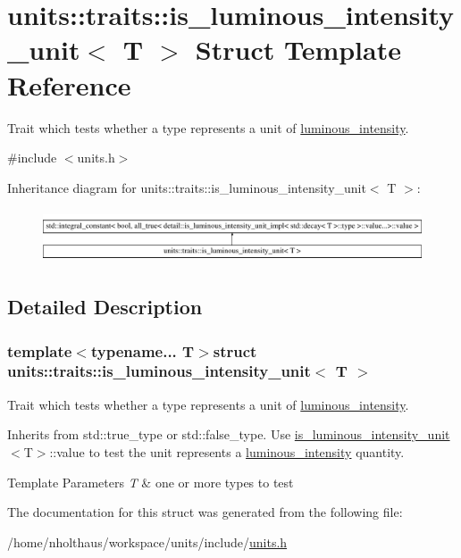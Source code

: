 \hypertarget{structunits_1_1traits_1_1is__luminous__intensity__unit}{}\section{units\+:\+:traits\+:\+:is\+\_\+luminous\+\_\+intensity\+\_\+unit$<$ T $>$ Struct Template Reference}
\label{structunits_1_1traits_1_1is__luminous__intensity__unit}


Trait which tests whether a type represents a unit of \hyperlink{namespaceunits_1_1luminous__intensity}{luminous\+\_\+intensity}.  




{\ttfamily \#include $<$units.\+h$>$}

Inheritance diagram for units\+:\+:traits\+:\+:is\+\_\+luminous\+\_\+intensity\+\_\+unit$<$ T $>$\+:\begin{figure}[H]
\begin{center}
\leavevmode
\includegraphics[height=1.613833cm]{structunits_1_1traits_1_1is__luminous__intensity__unit}
\end{center}
\end{figure}


\subsection{Detailed Description}
\subsubsection*{template$<$typename... T$>$struct units\+::traits\+::is\+\_\+luminous\+\_\+intensity\+\_\+unit$<$ T $>$}

Trait which tests whether a type represents a unit of \hyperlink{namespaceunits_1_1luminous__intensity}{luminous\+\_\+intensity}. 

Inherits from {\ttfamily std\+::true\+\_\+type} or {\ttfamily std\+::false\+\_\+type}. Use {\ttfamily \hyperlink{structunits_1_1traits_1_1is__luminous__intensity__unit}{is\+\_\+luminous\+\_\+intensity\+\_\+unit}$<$T$>$\+::value} to test the unit represents a \hyperlink{namespaceunits_1_1luminous__intensity}{luminous\+\_\+intensity} quantity. 
\begin{DoxyTemplParams}{Template Parameters}
{\em T} & one or more types to test \\
\hline
\end{DoxyTemplParams}


The documentation for this struct was generated from the following file\+:\begin{DoxyCompactItemize}
\item 
/home/nholthaus/workspace/units/include/\hyperlink{units_8h}{units.\+h}\end{DoxyCompactItemize}
